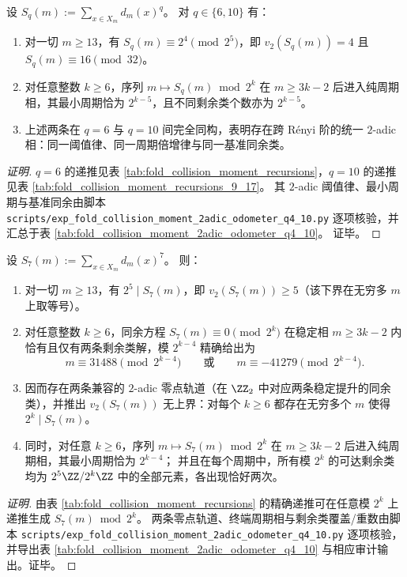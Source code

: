 \begin{conclusion}[\texorpdfstring{$q=6,10$}{q=6,10} 的统一 \(2\)-adic 相：固定 \texorpdfstring{$v_2$}{v2} 与线性阈值 \texorpdfstring{$3k-2$}{3k-2}]\label{con:pom-s6-s10-unified-2adic-phase}
设 \(S_q(m):=\sum_{x\in X_m} d_m(x)^q\)。
对 \(q\in\{6,10\}\) 有：
\begin{enumerate}
  \item 对一切 \(m\ge 13\)，有 \(S_q(m)\equiv 2^4\pmod{2^5}\)，即 \(v_2(S_q(m))=4\) 且 \(S_q(m)\equiv 16\pmod{32}\)。
  \item 对任意整数 \(k\ge 6\)，序列 \(m\mapsto S_q(m)\bmod 2^k\) 在 \(m\ge 3k-2\) 后进入纯周期相，其最小周期恰为 \(2^{k-5}\)，且不同剩余类个数亦为 \(2^{k-5}\)。
  \item 上述两条在 \(q=6\) 与 \(q=10\) 间完全同构，表明存在跨 Rényi 阶的统一 \(2\)-adic 相：同一阈值律、同一周期倍增律与同一基准同余类。
\end{enumerate}
\end{conclusion}
\begin{proof}[证明]
\(q=6\) 的递推见表 \ref{tab:fold_collision_moment_recursions}，\(q=10\) 的递推见表 \ref{tab:fold_collision_moment_recursions_9_17}。
其 \(2\)-adic 阈值律、最小周期与基准同余由脚本 \texttt{scripts/exp\_fold\_collision\_moment\_2adic\_odometer\_q4\_10.py} 逐项核验，并汇总于表 \ref{tab:fold_collision_moment_2adic_odometer_q4_10}。
证毕。
\end{proof}

\begin{conclusion}[\texorpdfstring{$q=7$}{q=7} 的 \(2\)-adic 双根现象：两条 \(2\)-adic 共轭零点轨道精确刻画高阶整除]\label{con:pom-s7-2adic-two-root-zero-orbits}
设 \(S_7(m):=\sum_{x\in X_m} d_m(x)^7\)。
则：
\begin{enumerate}
  \item 对一切 \(m\ge 13\)，有 \(2^5\mid S_7(m)\)，即 \(v_2(S_7(m))\ge 5\)（该下界在无穷多 \(m\) 上取等号）。
  \item 对任意整数 \(k\ge 6\)，同余方程 \(S_7(m)\equiv 0\pmod{2^k}\) 在稳定相 \(m\ge 3k-2\) 内恰有且仅有两条剩余类解，模 \(2^{k-4}\) 精确给出为
  \[
  m\equiv 31488\pmod{2^{k-4}}
  \qquad\text{或}\qquad
  m\equiv -41279\pmod{2^{k-4}}.
  \]
  \item 因而存在两条兼容的 \(2\)-adic 零点轨道（在 \(\ZZ_2\) 中对应两条稳定提升的同余类），并推出 \(v_2(S_7(m))\) 无上界：对每个 \(k\ge 6\) 都存在无穷多个 \(m\) 使得 \(2^k\mid S_7(m)\)。
  \item 同时，对任意 \(k\ge 6\)，序列 \(m\mapsto S_7(m)\bmod 2^k\) 在 \(m\ge 3k-2\) 后进入纯周期相，其最小周期恰为 \(2^{k-4}\)；
  并且在每个周期中，所有模 \(2^k\) 的可达剩余类均为 \(2^5\ZZ/2^k\ZZ\) 中的全部元素，各出现恰好两次。
\end{enumerate}
\end{conclusion}
\begin{proof}[证明]
由表 \ref{tab:fold_collision_moment_recursions} 的精确递推可在任意模 \(2^k\) 上递推生成 \(S_7(m)\bmod 2^k\)。
两条零点轨道、终端周期相与剩余类覆盖/重数由脚本 \texttt{scripts/exp\_fold\_collision\_moment\_2adic\_odometer\_q4\_10.py} 逐项核验，并导出表 \ref{tab:fold_collision_moment_2adic_odometer_q4_10} 与相应审计输出。证毕。
\end{proof}

